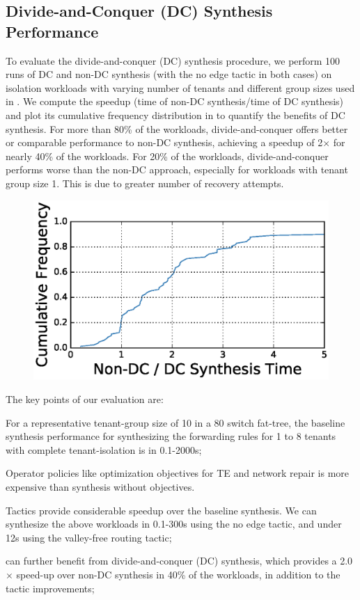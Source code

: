 \subsection{Divide-and-Conquer (DC) Synthesis Performance} \label{sec:optimisticeval} 
To evaluate the divide-and-conquer (DC) synthesis procedure, we
perform 100 runs of DC and non-DC synthesis 
(with the no edge tactic in both cases) on isolation
workloads with varying number of tenants and different group sizes
used in . We compute the
speedup (time of non-DC synthesis/time of DC synthesis) and plot its
cumulative frequency distribution in  to quantify
the benefits of DC synthesis. For more than 80\% of the
workloads, divide-and-conquer offers better or comparable
performance to non-DC synthesis, achieving a speedup of
2$\times$ for nearly 40\% of the workloads. For 20\% of the workloads,
divide-and-conquer performs worse than the non-DC approach,
especially for workloads with tenant group size 1.  This is due to
greater number of recovery attempts. 
\begin{figure}
	\centering
	\includegraphics[width=0.65\columnwidth]{figures/dcSynthesis.eps}
	\label{fig:dcsyn-cdf}
\end{figure}


 The key points of our evaluation are:
\begin{compactitemize}
\item For a representative tenant-group size of 10 in a 80 switch
  fat-tree, the baseline synthesis performance for synthesizing the
  forwarding rules for 1 to 8 tenants with complete tenant-isolation
  is in 0.1-2000s;
   \item Operator policies like optimization objectives for TE and  
   network repair is more expensive than synthesis without
   objectives.
      \item Tactics provide considerable speedup over the
        baseline synthesis.  We can
        synthesize the above workloads in 0.1-300s using the no edge
        tactic, and under 12s using the valley-free routing tactic;
      \item \Name can further benefit from 
        divide-and-conquer (DC) synthesis, which provides a 2.0$\times$ speed-up
        over non-DC synthesis in 40\% of the workloads, in
        addition to the tactic improvements;
\end{compactitemize}



